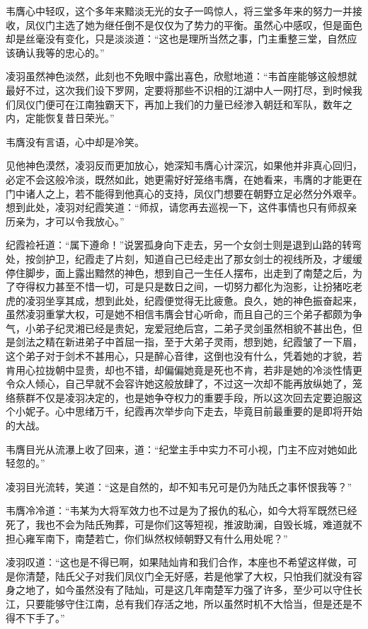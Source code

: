 韦膺心中轻叹，这个多年来黯淡无光的女子一鸣惊人，将三堂多年来的努力一并接收，凤仪门主选了她为继任倒不是仅仅为了势力的平衡。虽然心中感叹，但是面色却是丝毫没有变化，只是淡淡道：“这也是理所当然之事，门主重整三堂，自然应该确认我等的忠心的。”

凌羽虽然神色淡然，此刻也不免眼中露出喜色，欣慰地道：“韦首座能够这般想就最好不过，这次我们设下罗网，定要将那些不识相的江湖中人一网打尽，到时候我们凤仪门便可在江南独霸天下，再加上我们的力量已经渗入朝廷和军队，数年之内，定能恢复昔日荣光。”

韦膺没有言语，心中却是冷笑。

见他神色漠然，凌羽反而更加放心，她深知韦膺心计深沉，如果他并非真心回归，必定不会这般冷淡，既然如此，她更需好好笼络韦膺，在她看来，韦膺的才能更在门中诸人之上，若不能得到他真心的支持，凤仪门想要在朝野立足必然分外艰辛。想到此处，凌羽对纪霞笑道：“师叔，请您再去巡视一下，这件事情也只有师叔亲历亲为，才可以令我放心。”

纪霞裣衽道：“属下遵命！”说罢孤身向下走去，另一个女剑士则是退到山路的转弯处，按剑护卫，纪霞走了片刻，知道自己已经走出了那女剑士的视线所及，才缓缓停住脚步，面上露出黯然的神色，想到自己一生任人摆布，出走到了南楚之后，为了夺得权力甚至不惜一切，可是只是数日之间，一切努力都化为泡影，让扮猪吃老虎的凌羽坐享其成，想到此处，纪霞便觉得无比疲惫。良久，她的神色振奋起来，虽然凌羽重掌大权，可是她不相信韦膺会甘心听命，而且自己的三个弟子都颇为争气，小弟子纪灵湘已经是贵妃，宠爱冠绝后宫，二弟子灵剑虽然相貌不甚出色，但是剑法之精在新进弟子中首屈一指，至于大弟子灵雨，想到她，纪霞皱了一下眉，这个弟子对于剑术不甚用心，只是醉心音律，这倒也没有什么，凭着她的才貌，若肯用心拉拢朝中显贵，却也不错，却偏偏她竟是死也不肯，若非是她的冷淡性情更令众人倾心，自己早就不会容许她这般放肆了，不过这一次却不能再放纵她了，笼络蔡群不仅是凌羽决定的，也是她争夺权力的重要手段，所以这次回去定要迫服这个小妮子。心中思绪万千，纪霞再次举步向下走去，毕竟目前最重要的是即将开始的大战。

韦膺目光从流瀑上收了回来，道：“纪堂主手中实力不可小视，门主不应对她如此轻忽的。”

凌羽目光流转，笑道：“这是自然的，却不知韦兄可是仍为陆氏之事怀恨我等？”

韦膺冷冷道：“韦某为大将军效力也不过是为了报仇的私心，如今大将军既然已经死了，我也不会为陆氏殉葬，可是你们这等短视，推波助澜，自毁长城，难道就不担心雍军南下，南楚若亡，你们纵然权倾朝野又有什么用处呢？”

凌羽叹道：“这也是不得已啊，如果陆灿肯和我们合作，本座也不希望这样做，可是你清楚，陆氏父子对我们凤仪门全无好感，若是他掌了大权，只怕我们就没有容身之地了，如今虽然没有了陆灿，可是这几年南楚军力强了许多，至少可以守住长江，只要能够守住江南，总有我们存活之地，所以虽然时机不大恰当，但是还是不得不下手了。”

